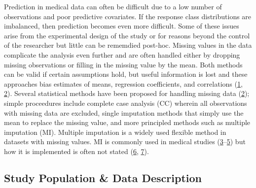 \documentclass[12pt,]{article}
\begin{document}
Prediction in medical data can often be difficult due to a low number of
observations and poor predictive covariates. If the response class
distributions are imbalanced, then prediction becomes even more
difficult. Some of these issues arise from the experimental design of
the study or for reasons beyond the control of the researcher but little
can be rememdied post-hoc. Missing values in the data complicate the
analysis even further and are often handled either by dropping missing
observations or filling in the missing value by the mean. Both methods
can be valid if certain assumptions hold, but useful information is lost
and these approaches bias estimates of means, regression coefficients,
and correlations (\protect\hyperlink{ref-van_buuren_flexible_2012}{1},
\protect\hyperlink{ref-schafer_missing_2002}{2}). Several statistical
methods have been proposed for handling missing data
(\protect\hyperlink{ref-schafer_missing_2002}{2}); simple proceedures
include complete case analysis (CC) wherein all observations with
missing data are excluded, single imputation methods that simply use the
mean to replace the missing value, and more principled methods such as
multiple imputation (MI). Multiple imputation is a widely used flexible
method in datasets with missing values. MI is commonly used in medical
studies
(\protect\hyperlink{ref-powney_review_2014}{3}--\protect\hyperlink{ref-wood_are_2004}{5})
but how it is implemented is often not stated
(\protect\hyperlink{ref-mackinnon_use_2010}{6},
\protect\hyperlink{ref-hayati_rezvan_rise_2015}{7}).

\subsection{Study Population \& Data
Description}\label{study-population-data-description}
\end{document}
